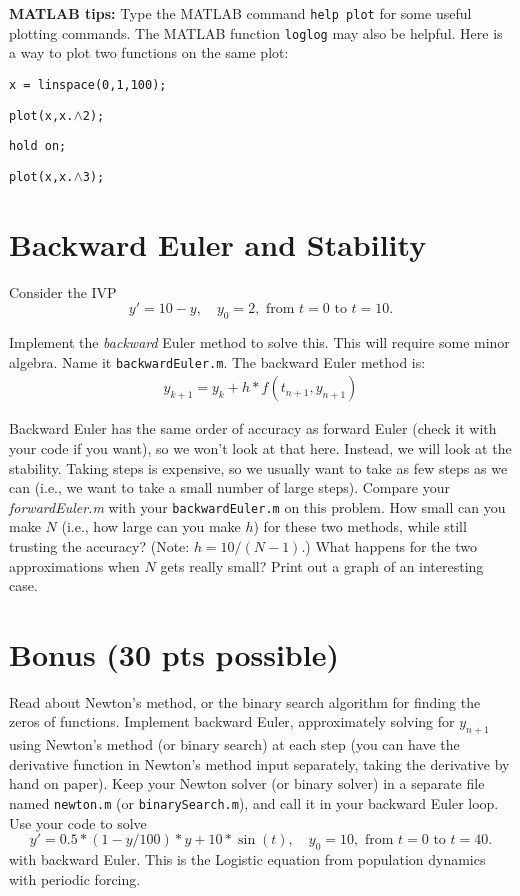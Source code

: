 \documentclass[final,11pt]{article}
\begin{document}
\textbf{MATLAB tips:} Type the MATLAB command {\tt help plot} for some useful plotting commands.  The MATLAB function \texttt{loglog} may also be helpful.  Here is a way to plot two functions on the same plot:

\texttt{x = linspace(0,1,100);}

\texttt{plot(x,x.$\wedge$2);}

\texttt{hold on;}

\texttt{plot(x,x.$\wedge$3);}

\section{Backward Euler and Stability}
Consider the IVP
\[
y' = 10 - y, \quad y_0=2, \text{ from } t = 0 \text{ to } t = 10.
\]

Implement the \textit{backward} Euler method to solve this. This will require some minor algebra.  Name it \texttt{backwardEuler.m}.  The backward Euler method is:
\begin{align*}
 y_{k+1} = y_k + h*f(t_{n+1},y_{n+1})
\end{align*}


Backward Euler has the same order of accuracy as forward Euler (check it with your code if you want), so we won't look at that here.  Instead, we will look at the stability.  Taking steps is expensive, so we usually want to take as few steps as we can (i.e., we want to take a small number of large steps).  Compare your \textit{forwardEuler.m} with your \texttt{backwardEuler.m} on this problem. How small can you make $N$ (i.e., how large can you make  $h$) for these two methods, while still trusting the accuracy?  (Note: $h = 10/(N-1)$.)  What happens for the two approximations when $N$ gets really small?  Print out a graph of an interesting case.   

\section{Bonus (30 pts possible)}
Read about Newton's method, or the binary search algorithm for finding the zeros of functions.  Implement backward Euler, approximately solving for $y_{n+1}$ using Newton's method (or binary search) at each step (you can have the derivative function in Newton's method input separately, taking the derivative by hand on paper).  Keep your Newton solver (or binary solver) in a separate file named \texttt{newton.m} (or \texttt{binarySearch.m}), and call it in your backward Euler loop.  Use your code to solve
\[
y' = 0.5*(1-y/100)*y+10*\sin(t), \quad y_0=10, \text{ from } t = 0 \text{ to } t = 40.
\]
with backward Euler.  This is the Logistic equation from population dynamics with periodic forcing.
\end{document}

